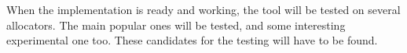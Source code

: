 When the implementation is ready and working, the tool will be tested on several allocators. The main popular ones will be tested, and some interesting experimental one too. These candidates for the testing will have to be found. 
